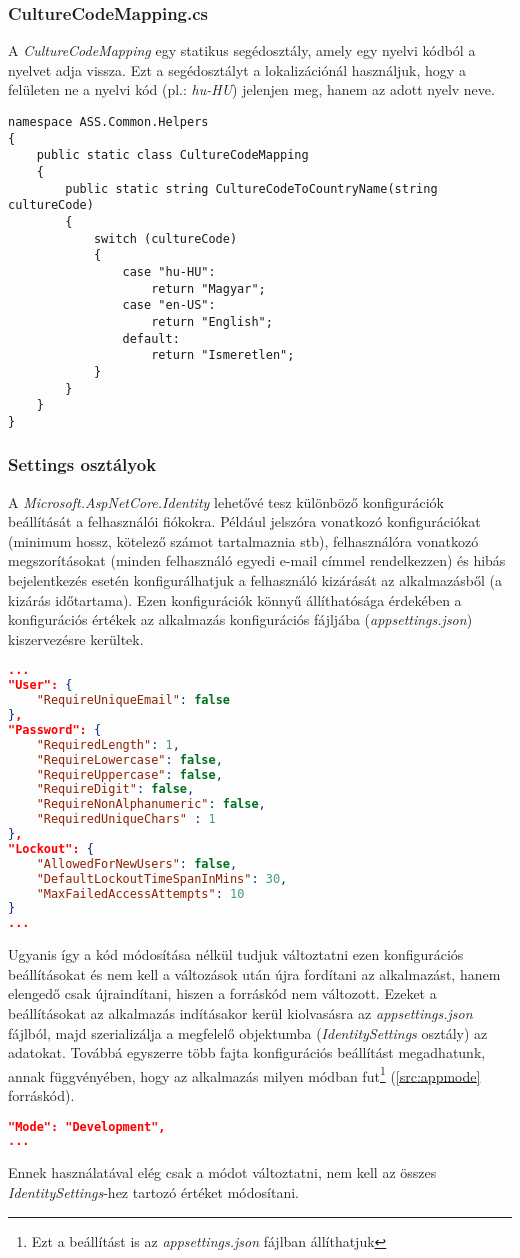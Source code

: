 \subsubsection{CultureCodeMapping.cs}
A \emph{CultureCodeMapping} egy statikus segédosztály, amely egy nyelvi kódból a nyelvet adja vissza. Ezt a segédosztályt a lokalizációnál használjuk, hogy a felületen ne a nyelvi kód (pl.: \emph{hu-HU}) jelenjen meg, hanem az adott nyelv neve.
\begin{lstlisting}[language={[Sharp]C}]
namespace ASS.Common.Helpers
{
	public static class CultureCodeMapping
	{
		public static string CultureCodeToCountryName(string cultureCode)
		{
			switch (cultureCode)
			{
				case "hu-HU":
					return "Magyar";
				case "en-US":
					return "English";
				default:
					return "Ismeretlen";
			}
		}
	}
}
\end{lstlisting}
\subsubsection{Settings osztályok}
A \emph{Microsoft.AspNetCore.Identity} \cite{IdentityOptions} lehetővé tesz különböző konfigurációk beállítását a felhasználói fiókokra. Például jelszóra vonatkozó konfigurációkat (minimum hossz, kötelező számot tartalmaznia stb), felhasználóra vonatkozó megszorításokat (minden felhasználó egyedi e-mail címmel rendelkezzen) és hibás bejelentkezés esetén konfigurálhatjuk a felhasználó kizárását az alkalmazásből (a kizárás időtartama). Ezen konfigurációk könnyű állíthatósága érdekében a konfigurációs értékek az alkalmazás konfigurációs fájljába (\emph{appsettings.json}) kiszervezésre kerültek.
\begin{lstlisting}[language=json]
...
"User": {
	"RequireUniqueEmail": false
},
"Password": {
	"RequiredLength": 1,
	"RequireLowercase": false,
	"RequireUppercase": false,
	"RequireDigit": false,
	"RequireNonAlphanumeric": false,
	"RequiredUniqueChars" : 1
},
"Lockout": {
	"AllowedForNewUsers": false,
	"DefaultLockoutTimeSpanInMins": 30,
	"MaxFailedAccessAttempts": 10
}
...
\end{lstlisting}
Ugyanis így a kód módosítása nélkül tudjuk változtatni ezen konfigurációs beállításokat és nem kell a változások után újra fordítani az alkalmazást, hanem elengedő csak újraindítani, hiszen a forráskód nem változott. Ezeket a beállításokat az alkalmazás indításakor kerül kiolvasásra az \emph{appsettings.json} fájlból, majd szerializálja a megfelelő objektumba (\emph{IdentitySettings} osztály) az adatokat. Továbbá egyszerre több fajta konfigurációs beállítást megadhatunk, annak függvényében, hogy az alkalmazás milyen módban fut\footnote{Ezt a beállítást is az \emph{appsettings.json} fájlban állíthatjuk} (\ref{src:appmode} forráskód).
\begin{lstlisting}[language=json]
"Mode": "Development",
...
\end{lstlisting}
Ennek használatával elég csak a módot változtatni, nem kell az összes \emph{IdentitySettings}-hez tartozó értéket módosítani.
